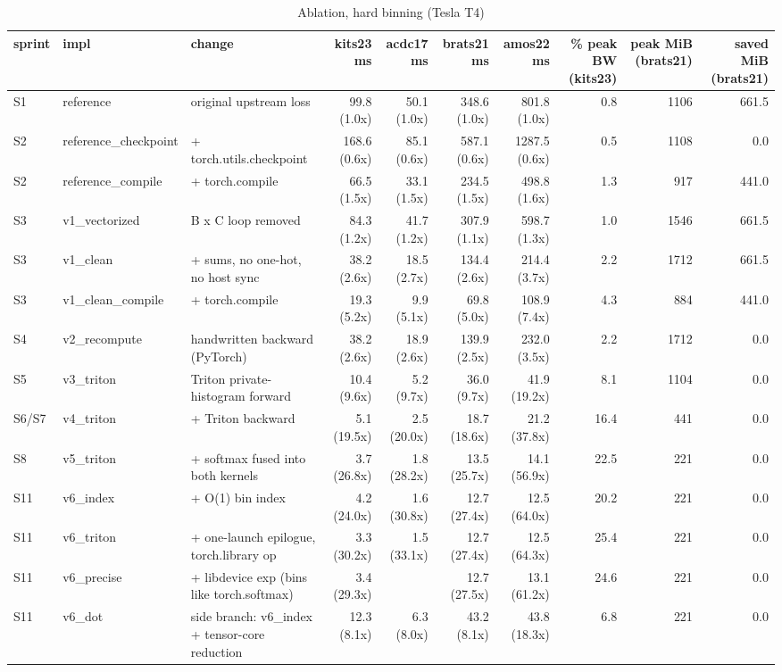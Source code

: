 \begin{table}[t]
\centering\small
\begin{tabular}{lllrrrrrrr}
\toprule
sprint & impl & change & kits23 ms & acdc17 ms & brats21 ms & amos22 ms & \% peak BW (kits23) & peak MiB (brats21) & saved MiB (brats21) \\
\midrule
S1 & reference & original upstream loss & 99.8 (1.0x) & 50.1 (1.0x) & 348.6 (1.0x) & 801.8 (1.0x) & 0.8 & 1106 & 661.5 \\
S2 & reference\_checkpoint & + torch.utils.checkpoint & 168.6 (0.6x) & 85.1 (0.6x) & 587.1 (0.6x) & 1287.5 (0.6x) & 0.5 & 1108 & 0.0 \\
S2 & reference\_compile & + torch.compile & 66.5 (1.5x) & 33.1 (1.5x) & 234.5 (1.5x) & 498.8 (1.6x) & 1.3 & 917 & 441.0 \\
S3 & v1\_vectorized & B x C loop removed & 84.3 (1.2x) & 41.7 (1.2x) & 307.9 (1.1x) & 598.7 (1.3x) & 1.0 & 1546 & 661.5 \\
S3 & v1\_clean & + sums, no one-hot, no host sync & 38.2 (2.6x) & 18.5 (2.7x) & 134.4 (2.6x) & 214.4 (3.7x) & 2.2 & 1712 & 661.5 \\
S3 & v1\_clean\_compile & + torch.compile & 19.3 (5.2x) & 9.9 (5.1x) & 69.8 (5.0x) & 108.9 (7.4x) & 4.3 & 884 & 441.0 \\
S4 & v2\_recompute & handwritten backward (PyTorch) & 38.2 (2.6x) & 18.9 (2.6x) & 139.9 (2.5x) & 232.0 (3.5x) & 2.2 & 1712 & 0.0 \\
S5 & v3\_triton & Triton private-histogram forward & 10.4 (9.6x) & 5.2 (9.7x) & 36.0 (9.7x) & 41.9 (19.2x) & 8.1 & 1104 & 0.0 \\
S6/S7 & v4\_triton & + Triton backward & 5.1 (19.5x) & 2.5 (20.0x) & 18.7 (18.6x) & 21.2 (37.8x) & 16.4 & 441 & 0.0 \\
S8 & v5\_triton & + softmax fused into both kernels & 3.7 (26.8x) & 1.8 (28.2x) & 13.5 (25.7x) & 14.1 (56.9x) & 22.5 & 221 & 0.0 \\
S11 & v6\_index & + O(1) bin index & 4.2 (24.0x) & 1.6 (30.8x) & 12.7 (27.4x) & 12.5 (64.0x) & 20.2 & 221 & 0.0 \\
S11 & v6\_triton & + one-launch epilogue, torch.library op & 3.3 (30.2x) & 1.5 (33.1x) & 12.7 (27.4x) & 12.5 (64.3x) & 25.4 & 221 & 0.0 \\
S11 & v6\_precise & + libdevice exp (bins like torch.softmax) & 3.4 (29.3x) &  & 12.7 (27.5x) & 13.1 (61.2x) & 24.6 & 221 & 0.0 \\
S11 & v6\_dot & side branch: v6\_index + tensor-core reduction & 12.3 (8.1x) & 6.3 (8.0x) & 43.2 (8.1x) & 43.8 (18.3x) & 6.8 & 221 & 0.0 \\
\bottomrule
\end{tabular}
\caption{Ablation, hard binning (Tesla T4)}
\end{table}

